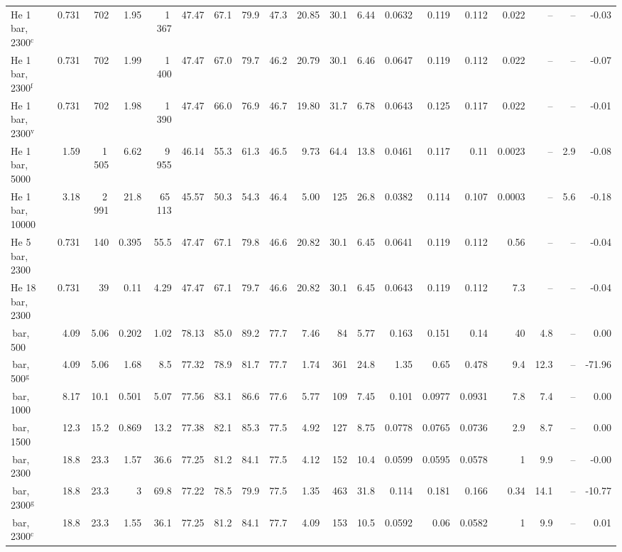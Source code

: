 \begin{table}[H]
{\begin{tabular}{l r r r r r r r r r r r r r r r r r r}
He 1\,bar, 2300$^{\mathrm{c}}$ & 0.731 & 702 & 1.95 & 1\,367 & 47.47 & 67.1 & 79.9 & 47.3 & 20.85 & 30.1 & 6.44 & 0.0632 & 0.119 & 0.112 & 0.022 & -- & -- & -0.03 \\
He 1\,bar, 2300$^{\mathrm{f}}$ & 0.731 & 702 & 1.99 & 1\,400 & 47.47 & 67.0 & 79.7 & 46.2 & 20.79 & 30.1 & 6.46 & 0.0647 & 0.119 & 0.112 & 0.022 & -- & -- & -0.07 \\
He 1\,bar, 2300$^{\mathrm{v}}$ & 0.731 & 702 & 1.98 & 1\,390 & 47.47 & 66.0 & 76.9 & 46.7 & 19.80 & 31.7 & 6.78 & 0.0643 & 0.125 & 0.117 & 0.022 & -- & -- & -0.01 \\
He 1\,bar, 5000 & 1.59 & 1\,505 & 6.62 & 9\,955 & 46.14 & 55.3 & 61.3 & 46.5 & 9.73 & 64.4 & 13.8 & 0.0461 & 0.117 & 0.11 & 0.0023 & -- & 2.9 & -0.08 \\
He 1\,bar, 10000 & 3.18 & 2\,991 & 21.8 & 65\,113 & 45.57 & 50.3 & 54.3 & 46.4 & 5.00 & 125 & 26.8 & 0.0382 & 0.114 & 0.107 & 0.0003 & -- & 5.6 & -0.18 \\
He 5\,bar, 2300 & 0.731 & 140 & 0.395 & 55.5 & 47.47 & 67.1 & 79.8 & 46.6 & 20.82 & 30.1 & 6.45 & 0.0641 & 0.119 & 0.112 & 0.56 & -- & -- & -0.04 \\
He 18\,bar, 2300 & 0.731 & 39 & 0.11 & 4.29 & 47.47 & 67.1 & 79.7 & 46.6 & 20.82 & 30.1 & 6.45 & 0.0643 & 0.119 & 0.112 & 7.3 & -- & -- & -0.04 \\
\LNtwo 3\,bar, 500 & 4.09 & 5.06 & 0.202 & 1.02 & 78.13 & 85.0 & 89.2 & 77.7 & 7.46 & 84 & 5.77 & 0.163 & 0.151 & 0.14 & 40 & 4.8 & -- & 0.00 \\
\LNtwo 3\,bar, 500$^{\mathrm{g}}$ & 4.09 & 5.06 & 1.68 & 8.5 & 77.32 & 78.9 & 81.7 & 77.7 & 1.74 & 361 & 24.8 & 1.35 & 0.65 & 0.478 & 9.4 & 12.3 & -- & -71.96 \\
\LNtwo 3\,bar, 1000 & 8.17 & 10.1 & 0.501 & 5.07 & 77.56 & 83.1 & 86.6 & 77.6 & 5.77 & 109 & 7.45 & 0.101 & 0.0977 & 0.0931 & 7.8 & 7.4 & -- & 0.00 \\
\LNtwo 3\,bar, 1500 & 12.3 & 15.2 & 0.869 & 13.2 & 77.38 & 82.1 & 85.3 & 77.5 & 4.92 & 127 & 8.75 & 0.0778 & 0.0765 & 0.0736 & 2.9 & 8.7 & -- & 0.00 \\
\LNtwo 3\,bar, 2300 & 18.8 & 23.3 & 1.57 & 36.6 & 77.25 & 81.2 & 84.1 & 77.5 & 4.12 & 152 & 10.4 & 0.0599 & 0.0595 & 0.0578 & 1 & 9.9 & -- & -0.00 \\
\LNtwo 3\,bar, 2300$^{\mathrm{g}}$ & 18.8 & 23.3 & 3 & 69.8 & 77.22 & 78.5 & 79.9 & 77.5 & 1.35 & 463 & 31.8 & 0.114 & 0.181 & 0.166 & 0.34 & 14.1 & -- & -10.77 \\
\LNtwo 3\,bar, 2300$^{\mathrm{c}}$ & 18.8 & 23.3 & 1.55 & 36.1 & 77.25 & 81.2 & 84.1 & 77.7 & 4.09 & 153 & 10.5 & 0.0592 & 0.06 & 0.0582 & 1 & 9.9 & -- & 0.01 \\

\end{tabular}}
\end{table}
